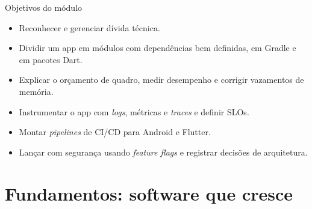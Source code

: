 \documentclass[aspectratio=169,10pt]{beamer}
\begin{document}
\capa

\begin{frame}{Objetivos do módulo}
  \begin{conceito}
    \begin{itemize}
      \item Reconhecer e gerenciar dívida técnica.
      \item Dividir um app em módulos com dependências bem definidas, em Gradle e em pacotes Dart.
      \item Explicar o orçamento de quadro, medir desempenho e corrigir vazamentos de memória.
      \item Instrumentar o app com \emph{logs}, métricas e \emph{traces} e definir SLOs.
      \item Montar \emph{pipelines} de CI/CD para Android e Flutter.
      \item Lançar com segurança usando \emph{feature flags} e registrar decisões de arquitetura.
    \end{itemize}
  \end{conceito}
\end{frame}

\sumario

\section{Fundamentos: software que cresce}
\end{document}
